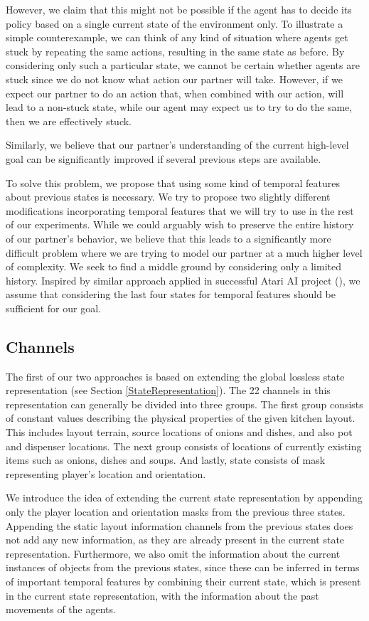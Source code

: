 However, we claim that this might not be possible if the agent has to decide its policy based on a single current state of the environment only.
To illustrate a simple counterexample, we can think of any kind of situation where agents get stuck by repeating the same actions, resulting in the same state as before.
By considering only such a particular state, we cannot be certain whether agents are stuck since we do not know what action our partner will take.
However, if we expect our partner to do an action that, when combined with our action, will lead to a non-stuck state, while our agent may expect us to try to do the same, then we are effectively stuck.

Similarly, we believe that our partner's understanding of the current high-level goal can be significantly improved if several previous steps are available.

To solve this problem, we propose that using some kind of temporal features about previous states is necessary.
We try to propose two slightly different modifications incorporating temporal features that we will try to use in the rest of our experiments.
While we could arguably wish to preserve the entire history of our partner's behavior, we believe that this leads to a significantly more difficult problem where we are trying to model our partner at a much higher level of complexity.
We seek to find a middle ground by considering only a limited history.
Inspired by similar approach applied in successful Atari AI project (\cite{Atari}), we assume that considering the last four states for temporal features should be sufficient for our goal.


\subsection{Channels}
The first of our two approaches is based on extending the global lossless state representation (see Section \ref{StateRepresentation}).
The 22 channels in this representation can generally be divided into three groups.
The first group consists of constant values describing the physical properties of the given kitchen layout. 
This includes layout terrain, source locations of onions and dishes, and also pot and dispenser locations.
The next group consists of locations of currently existing items such as onions, dishes and soups.
And lastly, state consists of mask representing player's location and orientation.

We introduce the idea of extending the current state representation by appending only the player location and orientation masks from the previous three states.
Appending the static layout information channels from the previous states does not add any new information, as they are already present in the current state representation.
Furthermore, we also omit the information about the current instances of objects from the previous states, since these can be inferred in terms of important temporal features by combining their current state, which is present in the current state representation, with the information about the past movements of the agents.

